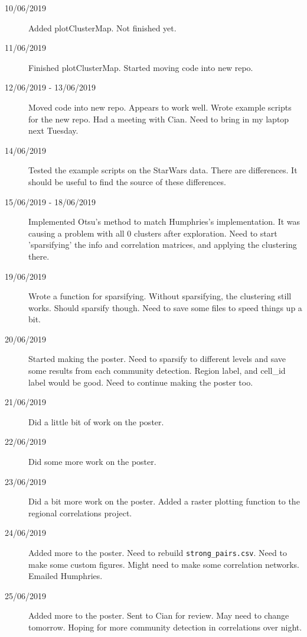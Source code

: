 \documentclass[a4paper,12pt]{article}
\theoremstyle{definition}
\begin{document}
\begin{description}
	\item[10/06/2019] Added plotClusterMap. Not finished yet.

	\item[11/06/2019] Finished plotClusterMap. Started moving code into new repo.

	\item[12/06/2019 - 13/06/2019] Moved code into new repo. Appears to work well. Wrote example scripts for the new repo. Had a meeting with Cian. Need to bring in my laptop next Tuesday.

	\item[14/06/2019] Tested the example scripts on the StarWars data. There are differences. It should be useful to find the source of these differences.

	\item[15/06/2019 - 18/06/2019] Implemented Otsu's method to match Humphries's implementation. It was causing a problem with all 0 clusters after exploration. Need to start 'sparsifying' the info and correlation matrices, and applying the clustering there.

	\item[19/06/2019] Wrote a function for sparsifying. Without sparsifying, the clustering still works. Should sparsify though. Need to save some files to speed things up a bit.

	\item[20/06/2019] Started making the poster. Need to sparsify to different levels and save some results from each community detection. Region label, and cell\_id label would be good. Need to continue making the poster too.
	\item[21/06/2019] Did a little bit of work on the poster.

	\item[22/06/2019] Did some more work on the poster.

	\item[23/06/2019] Did a bit more work on the poster. Added a raster plotting function to the regional correlations project.

	\item[24/06/2019] Added more to the poster. Need to rebuild \texttt{strong\_pairs.csv}. Need to make some custom figures. Might need to make some correlation networks. Emailed Humphries.

	\item[25/06/2019] Added more to the poster. Sent to Cian for review. May need to change tomorrow. Hoping for more community detection  in correlations over night.


\end{description}
\end{document}
